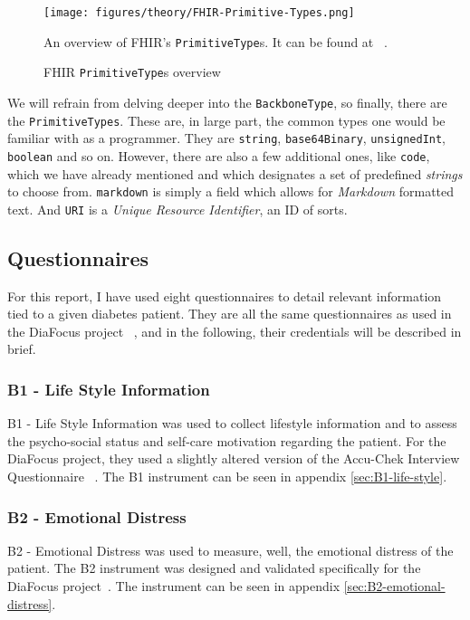 \begin{figure}[H]
    \centering
    \texttt{[image: figures/theory/FHIR-Primitive-Types.png]}
    \caption{FHIR \texttt{PrimitiveType}s overview}
    \medskip
    \small
    \raggedright
    An overview of FHIR's \texttt{PrimitiveType}s. It can be found at ~\cite{FHIR-data-types-overview}.
    \label{fig:FHIR-Primitive-Types}
\end{figure}

\noindent
We will refrain from delving deeper into the \texttt{BackboneType}, so finally, there are the \texttt{PrimitiveTypes}. These are, in large part, the common types one would be familiar with as a programmer. They are \texttt{string}, \texttt{base64Binary}, \texttt{unsignedInt}, \texttt{boolean} and so on. However, there are also a few additional ones, like \texttt{code}, which we have already mentioned and which designates a set of predefined \emph{strings} to choose from. \texttt{markdown} is simply a field which allows for \emph{Markdown} formatted text. And \texttt{URI} is a \emph{Unique Resource Identifier}, an ID of sorts.

\subsection{Questionnaires}\label{sec:theory-questionnaire}
For this report, I have used eight questionnaires to detail relevant information tied to a given diabetes patient. They are all the same questionnaires as used in the DiaFocus project ~\cite{DiaFocus}, and in the following, their credentials will be described in brief. 

\subsubsection*{B1 - Life Style Information}
B1 - Life Style Information was used to collect lifestyle information and to assess the psycho-social status and self-care motivation regarding the patient. For the DiaFocus project, they used a slightly altered version of the Accu-Chek Interview Questionnaire ~\cite{Accu-Chek}. The B1 instrument can be seen in appendix \autoref{sec:B1-life-style}.

\subsubsection*{B2 - Emotional Distress}
B2 - Emotional Distress was used to measure, well, the emotional distress of the patient. The B2 instrument was designed and validated specifically for the DiaFocus project~\cite{DiaFocus}. The instrument can be seen in appendix \autoref{sec:B2-emotional-distress}.

